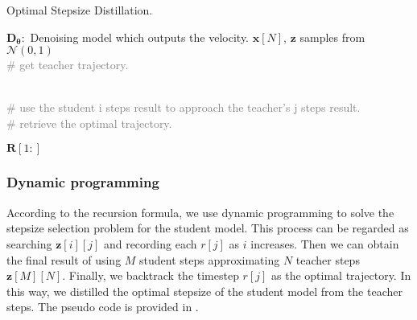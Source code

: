 \documentclass[10pt,twocolumn,letterpaper]{article}
\begin{document}
    \begin{algorithm}[h]
        \caption{Optimal Stepsize Distillation.}
        \label{alg:algorithm1}
        \begin{algorithmic}
            [1]
            {\Statex $\bm{D_{\theta}}:$ Denoising model which outputs the velocity.
            \Statex $\bm{x}[N]$, $\bm{z}$ samples from $ \mathcal{N}(0,1)$} \\
            
           
            \textcolor{gray}{\# get teacher trajectory.}

            
            \EndFor \\
            
            \textcolor{gray}{\# use the student i steps result to approach the teacher's j steps result. }
            \EndFor 
            \EndFor 
            \EndFor \\
            \textcolor{gray}{\# retrieve the optimal trajectory. }

            \EndFor 
{} $\bm{R}[1:]$
        \end{algorithmic}
    \end{algorithm}
    



    
 

    \subsubsection{Dynamic programming}
    According to the recursion formula, we use dynamic programming to solve the stepsize selection problem for the student model. This process can be regarded as searching $\bm{z}[i][j]$ and recording each $r[j]$ as $i$ increases. Then we can obtain the final result of using $M$ student steps approximating $N$ teacher steps $\bm{z}[M][N]$. Finally, we backtrack the timestep $r[j]$ as the optimal trajectory. In this way, we distilled the optimal stepsize of the student model from the teacher steps. The pseudo code is provided in . 
\end{document}
